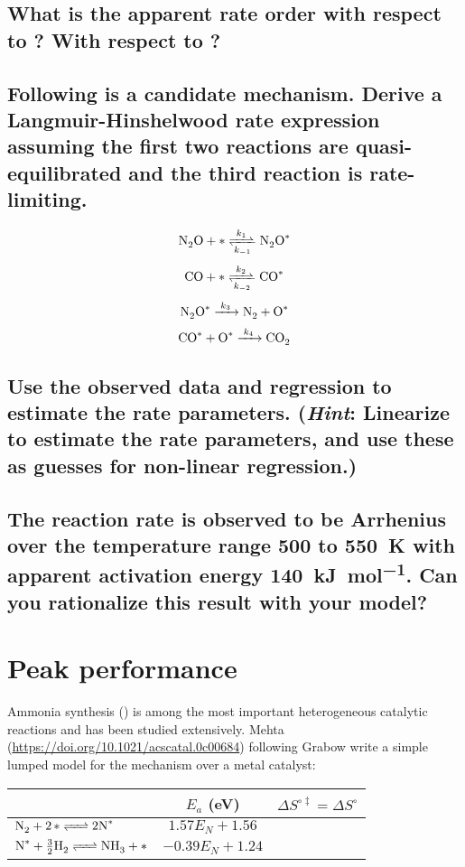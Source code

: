 \documentclass[11pt]{article}
\begin{document}
\subsection{What is the apparent rate order with respect to ? With respect to ?}
\label{sec:org78fbcf7}

\subsection{Following is a candidate mechanism. Derive a Langmuir-Hinshelwood rate expression assuming the first two reactions are quasi-equilibrated and the third reaction is rate-limiting.}
\label{sec:orgb6c4a85}

\[ \ce{N2O + \ast{} <=>[k_1][k_{-1}] N2O^\ast} \]
\[ \ce{CO + \ast{} <=>[k_2][k_{-2}] CO^\ast} \]
\[ \ce{N2O^\ast{} ->[k_3] N2 + O^\ast} \]
\[ \ce{CO^\ast{} + O^\ast{} ->[k_4] CO2 } \]

\subsection{Use the observed data and regression to estimate the rate parameters. (\emph{Hint}: Linearize to estimate the rate parameters, and use these as guesses for non-linear regression.)}
\label{sec:org2c8d555}

\subsection{The reaction rate is observed to be Arrhenius over the temperature range 500 to \SI{550}{K} with apparent activation energy \SI{140}{\kilo\joule\per\mole}. Can you rationalize this result with your model?}
\label{sec:orgff6326a}

\section{Peak performance}
\label{sec:org59624aa}
Ammonia synthesis () is among the most important heterogeneous catalytic reactions and has been studied extensively. Mehta (\url{https://doi.org/10.1021/acscatal.0c00684}) following Grabow write a simple lumped model for the mechanism over a metal catalyst:

\begin{center}
\begin{tabular}{lcc}
\hline
 & \(E_a\) (eV) & \(\Delta S^{\circ\ddagger} = \Delta S^\circ\)\\
\hline
\(\ce{N2 + 2\ast{} <=> 2 N^\ast{} }\) & \(1.57 E_N + 1.56\) & \\
\(\ce{N^\ast{} + 3/2 H2 <=> NH3 + \ast{}}\) & \(-0.39 E_N + 1.24\) & \\
\hline
\end{tabular}
\end{center}
\end{document}
